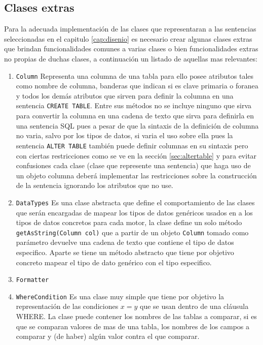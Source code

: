 \subsection{Clases extras}\label{sec:extras}
Para la adecuada implementación de las clases que representaran a las sentencias seleccionadas en el capitulo \ref{cap:disenio} es necesario crear algunas clases extras que brindan funcionalidades comunes a varias clases o bien funcionalidades extras no propias de duchas clases, a continuación un listado de aquellas mas relevantes:
\begin{enumerate}

\item \verb=Column= Representa una columna de una tabla para ello posee atributos tales como nombre de columna, banderas que indican si es clave primaria o foranea y todos los demás atributos que sirven para definir la columna en una sentencia \verb=CREATE TABLE=. Entre sus métodos no se incluye ninguno que sirva para convertir la columna en una cadena  de texto que sirva para definirla en una sentencia SQL pues a pesar de que la sintaxis de la definición de columna no varia, salvo por los tipos de datos, si varia el uso sobre ella pues la sentencia \verb=ALTER TABLE= también puede definir columnas en su sintaxis pero con ciertas restricciones como se ve en la sección \ref{sec:altertable} y para evitar confusiones cada clase (clase que represente una sentencia) que haga uso de un objeto columna deberá implementar las restricciones sobre la construcción de la sentencia ignorando los atributos que no use. 

\item \verb=DataTypes= Es una clase abstracta que define el comportamiento de las clases que serán encargadas de mapear los tipos de datos genéricos usados en \cc a los tipos de datos concretos para cada motor, la clase define un solo método \verb=getAsString(Column col)= que a partir de un objeto \verb=Column= tomado como parámetro devuelve una cadena de texto que contiene el tipo de datos especifico. Aparte se tiene un método abstracto que tiene por objetivo concreto mapear el tipo de dato genérico con el tipo especifico.  

\item \verb=Formatter=

\item \verb=WhereCondition= Es una clase muy simple que tiene por objetivo la representación de las condiciones $ x = y $ que se usan dentro de una cláusula WHERE. La clase puede contener los nombres de las tablas a comparar, si es que se comparan valores de mas de una tabla, los nombres de los campos a comparar y (de haber) algún valor contra el que comparar.


\end{enumerate}
